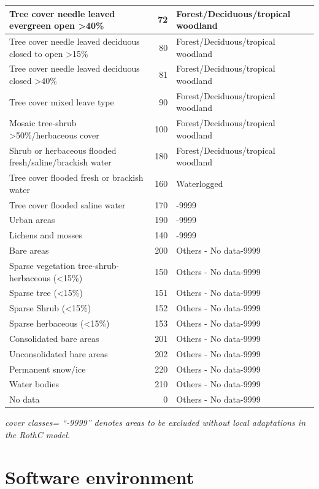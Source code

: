 \documentclass[
  10pt,
  b5paper,
]{book}
\begin{document}
\begin{table}
\begin{tabular}{l|r|l}
\hline
Tree cover needle leaved evergreen  open >40\% & 72 & Forest/Deciduous/tropical woodland\\
\hline
Tree cover needle leaved deciduous closed to open >15\% & 80 & Forest/Deciduous/tropical woodland\\
\hline
Tree cover needle leaved deciduous closed >40\% & 81 & Forest/Deciduous/tropical woodland\\
\hline
Tree cover mixed leave type & 90 & Forest/Deciduous/tropical woodland\\
\hline
Mosaic tree-shrub >50\%/herbaceous cover & 100 & Forest/Deciduous/tropical woodland\\
\hline
Shrub or herbaceous flooded fresh/saline/brackish water & 180 & Forest/Deciduous/tropical woodland\\
\hline
Tree cover flooded fresh or brackish water & 160 & Waterlogged\\
\hline
Tree cover flooded saline water & 170 & -9999\\
\hline
Urban areas & 190 & -9999\\
\hline
Lichens and mosses & 140 & -9999\\
\hline
Bare areas & 200 & Others  - No data-9999\\
\hline
Sparse vegetation tree-shrub-herbaceous (<15\%) & 150 & Others  - No data-9999\\
\hline
Sparse tree (<15\%) & 151 & Others  - No data-9999\\
\hline
Sparse Shrub (<15\%) & 152 & Others  - No data-9999\\
\hline
Sparse herbaceous (<15\%) & 153 & Others  - No data-9999\\
\hline
Consolidated bare areas & 201 & Others  - No data-9999\\
\hline
Unconsolidated bare areas & 202 & Others  - No data-9999\\
\hline
Permanent snow/ice & 220 & Others  - No data-9999\\
\hline
Water bodies & 210 & Others  - No data-9999\\
\hline
No data & 0 & Others  - No data-9999\\
\hline
\end{tabular}
\end{table}

\emph{cover classes= ``-9999'' denotes areas to be excluded without local adaptations in the RothC model.}

\hypertarget{software-environment}{%
\chapter{\textbar{} Software environment}\label{software-environment}}
\end{document}
